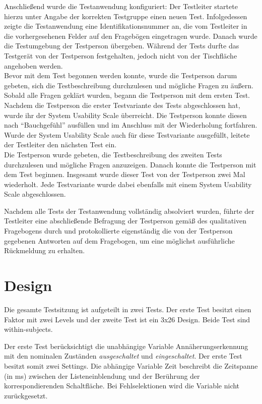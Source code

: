 \documentclass[12pt,numbers=noenddot,parskip,bibliography=totocnumbered,listof=totocnumbered]{scrreprt}
\begin{document}
Anschließend wurde die Testanwendung konfiguriert: Der Testleiter startete hierzu unter Angabe der korrekten Testgruppe einen neuen Test. Infolgedessen zeigte die Testanwendung eine Identifikationsnummer an, die vom Testleiter in die vorhergesehenen Felder auf den Fragebögen eingetragen wurde. Danach wurde die Testumgebung der Testperson übergeben. Während der Tests durfte das Testgerät von der Testperson festgehalten, jedoch nicht von der Tischfläche angehoben werden.\\
Bevor mit dem Test begonnen werden konnte, wurde die Testperson darum gebeten, sich die Testbeschreibung durchzulesen und mögliche Fragen zu äußern. Sobald alle Fragen geklärt wurden, begann die Testperson mit dem ersten Test.\\
Nachdem die Testperson die erster Testvariante des Tests abgeschlossen hat, wurde ihr der System Usability Scale überreicht. Die Testperson konnte diesen nach "`Bauchgefühl"' ausfüllen und im Anschluss mit der Wiederholung fortfahren. Wurde der System Usability Scale auch für diese Testvariante  ausgefüllt, leitete der Testleiter den nächsten Test ein.\\
Die Testperson wurde gebeten, die Testbeschreibung des zweiten Tests durchzulesen und mögliche Fragen anzuzeigen. Danach konnte die Testperson mit dem Test beginnen. Insgesamt wurde dieser Test von der Testperson zwei Mal wiederholt. Jede Testvariante wurde dabei ebenfalls mit einem System Usability Scale abgeschlossen.

Nachdem alle Tests der Testanwendung vollständig absolviert wurden, führte der Testleiter eine abschließende Befragung der Testperson gemäß des qualitativen Fragebogens durch und protokollierte eigenständig die von der Testperson gegebenen Antworten auf dem Fragebogen, um eine möglichst ausführliche Rückmeldung zu erhalten. 

\section{Design}\label{sec:design}
Die gesamte Testsitzung ist aufgeteilt in zwei Tests. Der erste Test besitzt einen Faktor mit zwei Levels und der zweite Test ist ein 3x26 Design. Beide Test sind within-subjects.

Der erste Test berücksichtigt die unabhängige Variable {\ttfamily Annäherungserkennung} mit den nominalen Zuständen \emph{ausgeschaltet} und \emph{eingeschaltet}. Der erste Test besitzt somit zwei Settings. Die abhängige Variable {\ttfamily Zeit} beschreibt die Zeitspanne (in ms) zwischen der Listeneinblendung und der Berührung der korrespondierenden Schaltfläche. Bei Fehlselektionen wird die Variable nicht zurückgesetzt.
\end{document}
